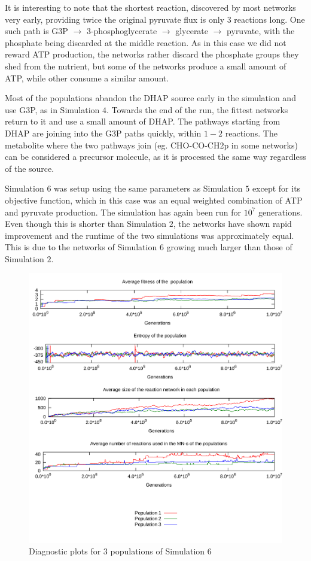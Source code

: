 \documentclass[a4paper,12pt]{article}
\begin{document}
It is interesting to note that the shortest reaction, discovered by most networks very early, providing twice the original pyruvate flux is only $3$ reactions long. One such path is G3P $\rightarrow$ 3-phosphoglycerate $\rightarrow$ glycerate $\rightarrow$ pyruvate, with the phosphate being discarded at the middle reaction. 
As in this case we did not reward ATP production, the networks rather discard the phosphate groups they shed from the nutrient, but some of the networks produce a small amount of ATP, while other consume a similar amount. 

Most of the populations abandon the DHAP source early in the simulation and use G3P, as in Simulation $4$. Towards the end of the run, the fittest networks return to it and use a small amount of DHAP. The pathways starting from DHAP are joining into the G3P paths quickly, within $1-2$ reactions. The metabolite where the two pathways join (eg. CHO-CO-CH2p in some networks) can be considered a precursor molecule, as it is processed the same way regardless of the source. 




Simulation $6$ was setup using the same parameters as Simulation $5$ except for its objective function, which in this case was an equal weighted combination of ATP and pyruvate production. The simulation has again been run for $10^7$ generations. Even though this is shorter than Simulation $2$, the networks have shown rapid improvement and the runtime of the two simulations was approximately equal. This is due to the networks of Simulation $6$ growing much larger than those of Simulation $2$. 

\begin{figure}[htpb]
	\centering
	\includegraphics[width=0.8\linewidth]{simulationequalatppyruvate.pdf}
	\caption{Diagnostic plots for 3 populations of Simulation 6}
	\label{fig:simulationequalatppyruvate}
\end{figure}
\end{document}
